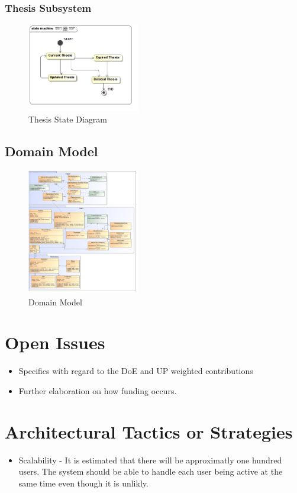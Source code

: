\documentclass{article}
\begin{document}
			\subsubsection{Thesis Subsystem}
				\begin{figure}[h!]
					\centerline{\includegraphics[width=186px]{5.4-SS5-7/SS7}}
					\caption{Thesis State Diagram}
				\end{figure}
				\newpage
		\subsection{Domain Model}
			\begin{figure}[h!]
				\centerline{\includegraphics[width=186px]{DomainModel/DomainModel}}
					\caption{Domain Model}
			\end{figure}
	\section{Open Issues}
	\begin{itemize}
		\item Specifics with regard to the DoE and UP weighted contributions
		\item Further elaboration on how funding occurs.
	\end{itemize}
	
	\section{Architectural Tactics or Strategies}
	
	\begin{itemize}
		\item Scalability - It is estimated that there will be approximatly one hundred users. The system should be able to handle each user being active at the same time even though it is unlikly.
	\end{itemize}
\end{document}
